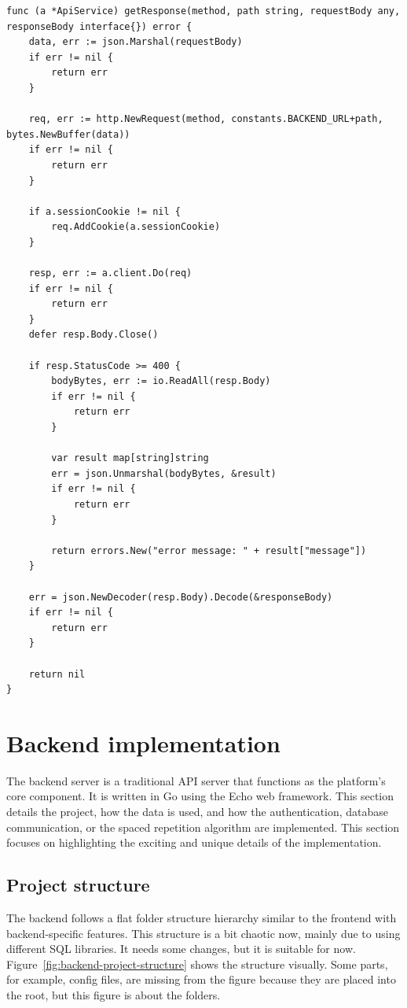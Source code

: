 \begin{lstlisting}[caption=ApiService code,label=lst:api-service]
func (a *ApiService) getResponse(method, path string, requestBody any, responseBody interface{}) error {
	data, err := json.Marshal(requestBody)
	if err != nil {
		return err
	}

	req, err := http.NewRequest(method, constants.BACKEND_URL+path, bytes.NewBuffer(data))
	if err != nil {
		return err
	}

	if a.sessionCookie != nil {
		req.AddCookie(a.sessionCookie)
	}

	resp, err := a.client.Do(req)
	if err != nil {
		return err
	}
	defer resp.Body.Close()

	if resp.StatusCode >= 400 {
		bodyBytes, err := io.ReadAll(resp.Body)
		if err != nil {
			return err
		}

		var result map[string]string
		err = json.Unmarshal(bodyBytes, &result)
		if err != nil {
			return err
		}

		return errors.New("error message: " + result["message"])
	}

	err = json.NewDecoder(resp.Body).Decode(&responseBody)
	if err != nil {
		return err
	}

	return nil
}
\end{lstlisting}

\section{Backend implementation}

The backend server is a traditional API server that functions as the platform's core component. It is written in Go using the Echo web framework. This section details the project, how the data is used, and how the authentication, database communication, or the spaced repetition algorithm are implemented. This section focuses on highlighting the exciting and unique details of the implementation.

\subsection{Project structure}

The backend follows a flat folder structure hierarchy similar to the frontend with backend-specific features. This structure is a bit chaotic now, mainly due to using different SQL libraries. It needs some changes, but it is suitable for now. Figure~\ref{fig:backend-project-structure} shows the structure visually. Some parts, for example, config files, are missing from the figure because they are placed into the root, but this figure is about the folders.

